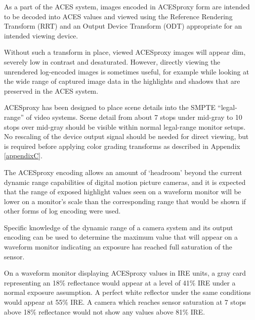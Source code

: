 \label{appendixA}

As a part of the ACES system, images encoded in ACESproxy form are intended to be decoded into ACES values and viewed using the Reference Rendering Transform (RRT) and an Output Device Transform (ODT) appropriate for an intended viewing device.

Without such a transform in place, viewed ACESproxy images will appear dim, severely low in contrast and desaturated. However, directly viewing the unrendered log-encoded images is sometimes useful, for example while looking at the wide range of captured image data in the highlights and shadows that are preserved in the ACES system. 

ACESproxy has been designed to place scene details into the SMPTE ``legal-range'' of video systems. Scene detail from about 7 stops under mid-gray to 10 stops over mid-gray should be visible within normal legal-range monitor setups. No rescaling of the device output signal should be needed for direct viewing, but is required before applying color grading transforms as described in Appendix \ref{appendixC}.

The ACESproxy encoding allows an amount of `headroom' beyond the current dynamic range capabilities of digital motion picture cameras, and it is expected that the range of exposed highlight values seen on a waveform monitor will be lower on a monitor’s scale than the corresponding range that would be shown if other forms of log encoding were used.

Specific knowledge of the dynamic range of a camera system and its output encoding can be used to determine the maximum value that will appear on a waveform monitor indicating an exposure has reached full saturation of the sensor.

On a waveform monitor displaying ACESproxy values in IRE units, a gray card representing an 18\% reflectance would appear at a level of 41\% IRE under a normal exposure assumption. A perfect white reflector under the same conditions would appear at 55\% IRE. A camera which reaches sensor saturation at 7 stops  above 18\% reflectance would not show any values above 81\% IRE.